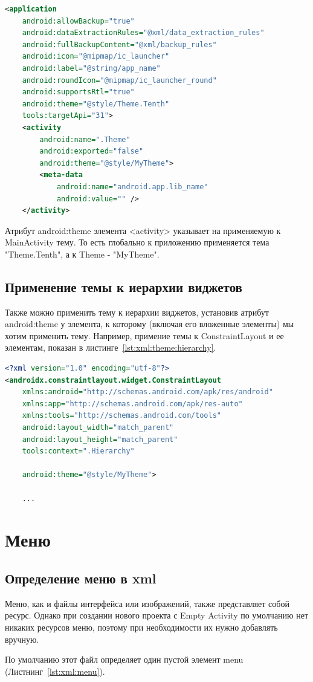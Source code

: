 \begin{lstlisting}[language=XML
	, label=lst:xml:theme
	]
<application
	android:allowBackup="true"
	android:dataExtractionRules="@xml/data_extraction_rules"
	android:fullBackupContent="@xml/backup_rules"
	android:icon="@mipmap/ic_launcher"
	android:label="@string/app_name"
	android:roundIcon="@mipmap/ic_launcher_round"
	android:supportsRtl="true"
	android:theme="@style/Theme.Tenth"
	tools:targetApi="31">
	<activity
		android:name=".Theme"
		android:exported="false"
		android:theme="@style/MyTheme">
		<meta-data
			android:name="android.app.lib_name"
			android:value="" />
	</activity>
\end{lstlisting}

Атрибут android:theme элемента <activity> указывает на применяемую к
MainActivity тему. То есть глобально к приложению применяется тема
"Theme.Tenth", а к Theme - "MyTheme".

\subsection{Применение темы к иерархии виджетов}
Также можно применить тему к иерархии виджетов, установив атрибут
android:theme у элемента, к которому (включая его вложенные элементы) 
мы хотим применить тему. Например, примение темы к ConstraintLayout и ее
элементам, показан в листинге~\ref{lst:xml:theme:hierarchy}.

\begin{lstlisting}[language=XML
	, label=lst:xml:theme:hierarchy
	]
<?xml version="1.0" encoding="utf-8"?>
<androidx.constraintlayout.widget.ConstraintLayout
    xmlns:android="http://schemas.android.com/apk/res/android"
    xmlns:app="http://schemas.android.com/apk/res-auto"
    xmlns:tools="http://schemas.android.com/tools"
    android:layout_width="match_parent"
    android:layout_height="match_parent"
    tools:context=".Hierarchy"

    android:theme="@style/MyTheme">

	...
\end{lstlisting}

\section{Меню}
\subsection{Определение меню в xml}
Меню, как и файлы интерфейса или изображений, также представляет собой
ресурс. Однако при создании нового проекта с Empty Activity по умолчанию
нет никаких ресурсов меню, поэтому при необходимости их нужно добавлять
вручную.\par
По умолчанию этот файл определяет один пустой элемент menu
(Листнинг~\ref{lst:xml:menu}).


